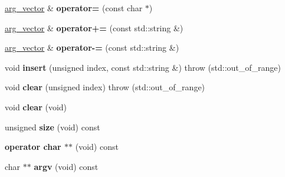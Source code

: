 \begin{DoxyCompactItemize}
\item 
\hyperlink{classstlplus_1_1arg__vector}{arg\+\_\+vector} \& {\bfseries operator=} (const char $\ast$)\hypertarget{classstlplus_1_1arg__vector_ae64af0d8b6db0416c66fe3199ae77c12}{}\label{classstlplus_1_1arg__vector_ae64af0d8b6db0416c66fe3199ae77c12}

\item 
\hyperlink{classstlplus_1_1arg__vector}{arg\+\_\+vector} \& {\bfseries operator+=} (const std\+::string \&)\hypertarget{classstlplus_1_1arg__vector_ade1060b4fe7cf5aa19597497efb6e74f}{}\label{classstlplus_1_1arg__vector_ade1060b4fe7cf5aa19597497efb6e74f}

\item 
\hyperlink{classstlplus_1_1arg__vector}{arg\+\_\+vector} \& {\bfseries operator-\/=} (const std\+::string \&)\hypertarget{classstlplus_1_1arg__vector_a1a0444527d614ef0be60551ad7231f4e}{}\label{classstlplus_1_1arg__vector_a1a0444527d614ef0be60551ad7231f4e}

\item 
void {\bfseries insert} (unsigned index, const std\+::string \&)  throw (std\+::out\+\_\+of\+\_\+range)\hypertarget{classstlplus_1_1arg__vector_aa21ad10b2d2e32c6ffb18c9384f0d93e}{}\label{classstlplus_1_1arg__vector_aa21ad10b2d2e32c6ffb18c9384f0d93e}

\item 
void {\bfseries clear} (unsigned index)  throw (std\+::out\+\_\+of\+\_\+range)\hypertarget{classstlplus_1_1arg__vector_ad021b6ef91e9331fec3c8f0c99490305}{}\label{classstlplus_1_1arg__vector_ad021b6ef91e9331fec3c8f0c99490305}

\item 
void {\bfseries clear} (void)\hypertarget{classstlplus_1_1arg__vector_a86b49f7162bb5d3c23a415c5122b1ba6}{}\label{classstlplus_1_1arg__vector_a86b49f7162bb5d3c23a415c5122b1ba6}

\item 
unsigned {\bfseries size} (void) const \hypertarget{classstlplus_1_1arg__vector_a077d0cf20ab5bd56f56797078ec4e771}{}\label{classstlplus_1_1arg__vector_a077d0cf20ab5bd56f56797078ec4e771}

\item 
{\bfseries operator char $\ast$$\ast$} (void) const \hypertarget{classstlplus_1_1arg__vector_a76628e87ede139d2ba3ab5a512fd0739}{}\label{classstlplus_1_1arg__vector_a76628e87ede139d2ba3ab5a512fd0739}

\item 
char $\ast$$\ast$ {\bfseries argv} (void) const \hypertarget{classstlplus_1_1arg__vector_a548b7345f6da05c1a8a64bdb96a1e3fb}{}\label{classstlplus_1_1arg__vector_a548b7345f6da05c1a8a64bdb96a1e3fb}


\end{DoxyCompactItemize}
